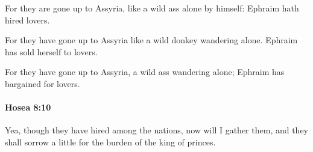 			\begin{versebox}
					\item[BHS] 
					\item[LXX] 
					\item[ASV] For they are gone up to Assyria, like a wild ass alone by himself: Ephraim hath hired lovers.
					\item[NIV] For they have gone up to Assyria like a wild donkey wandering alone. Ephraim has sold herself to lovers.
					\item[NRSV] For they have gone up to Assyria, a wild ass wandering alone; Ephraim has bargained for lovers.
			\end{versebox}

		\paragraph{Hosea 8:10} %
			\label{HOSEA-8-10}

			Yea, though they have hired among the nations, now will I gather them, and they shall sorrow a little for the burden of the king of princes.

